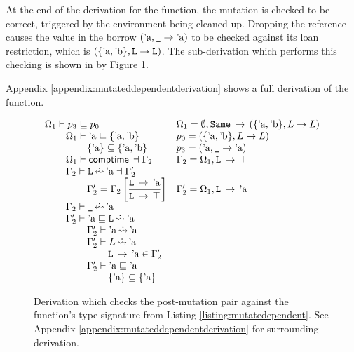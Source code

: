 \documentclass[12pt,twoside]{report}
\begin{document}
At the end of the derivation for the  function, the mutation is checked to be correct, triggered by the environment being cleaned up. Dropping the reference causes the value in the borrow $(\text{'a}, \text{\texttt{\_}} \rightarrow \text{'a})$ to be checked against its loan restriction, which is $(\{\text{'a}, \text{'b}\}, \text{\texttt{L}} \rightarrow \text{\texttt{L}})$. The sub-derivation which performs this checking is shown in by Figure \ref{fig:postmutationderivation}.

Appendix \ref{appendix:mutateddependentderivation} shows a full derivation of the  function.

\begin{figure}
  \[\begin{array}{ll}
    \Omega_1 \vdash p_3 \subtype p_0 
      & \Omega_1 = \emptyset, \absmapm{Same}{(\{\atom{a}, \atom{b}\}, L \rightarrow L)} \\
    \otab \Omega_1 \vdash \atom{a} \subtype \{\atom{a}, \atom{b}\} &
      p_0 = (\{\atom{a}, \atom{b}\}, L \rightarrow L) \\
    \otab\otab \{\atom{a}\} \subseteq \{\atom{a}, \atom{b}\}   &
      p_3 = (\atom{a}, \mono{\_} \rightarrow \atom{a}) \\
    \otab \Omega_1 \vdash \comptime{} \dashv \Gamma_2 &
      \Gamma_2 = \Omega_1,\absmapm{L}{\top} \\
    \otab \Gamma_2 \vdash \mono{L} \erasedwritearrow \atom{a} \dashv \Gamma_2' \\
    \otab\otab \Gamma_2' = \Gamma_2\left[\dfrac{\absmapm{L}{\atom{a}}}{\absmapm{L}{\top}}\right] &
       \Gamma_2' = \Omega_1,\absmapm{L}{\atom{a}} \\
    \otab \Gamma_2 \vdash \mono{\_} \erasedwritearrow \atom{a} \\
    \otab \Gamma_2' \vdash \atom{a} \subtype \mono{L} \erasedreadarrow \atom{a} \\
    \otab\otab \Gamma_2' \vdash \atom{a} \erasedreadarrow \atom{a} \\
    \otab\otab \Gamma_2' \vdash L \erasedreadarrow \atom{a} \\
    \otab\otab\otab \absmapm{L}{\atom{a}} \in \Gamma_2' \\
    \otab\otab \Gamma_2' \vdash \atom{a} \subtype \atom{a} \\
    \otab\otab\otab \{\atom{a}\} \subseteq \{\atom{a}\} \\
  \end{array}\]
  \caption{Derivation which checks the post-mutation pair against the  function's type signature from Listing \ref{listing:mutatedependent}. See Appendix \ref{appendix:mutateddependentderivation} for surrounding derivation.}
  \label{fig:postmutationderivation}
\end{figure}
\end{document}
